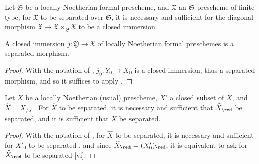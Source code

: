 \begin{corollary}[10.15.5]
\label{I.10.15.5}
Let $\mathfrak{S}$ be a locally Noetherian formal prescheme, and $\mathfrak{X}$ an $\mathfrak{S}$-prescheme of finite type;
for $\mathfrak{X}$ to be separated over $\mathfrak{S}$, it is necessary and sufficient for the diagonal morphism $\mathfrak{X}\to\mathfrak{X}\times_\mathfrak{S}\mathfrak{X}$ to be a closed immersion.
\end{corollary}

\begin{proposition}[10.15.6]
\label{I.10.15.6}
A closed immersion $j:\mathfrak{Y}\to\mathfrak{X}$ of locally Noetherian formal preschemes is a separated morphism.
\end{proposition}

\begin{proof}
With the notation of , $j_0:Y_0\to X_0$ is a closed immersion, thus a separated morphism, and so it suffices to apply .
\end{proof}

\begin{proposition}[10.15.7]
\label{I.10.15.7}
Let $X$ be a locally Noetherian (usual) prescheme, $X'$ a closed subset of $X$, and $\widehat{X}=X_{/X'}$.
For $\widehat{X}$ to be separated, it is necessary and sufficient that $\widehat{X}_\red$ be separated, and it is sufficient that $X$ be separated.
\end{proposition}

\begin{proof}
With the notation of , for $\widehat{X}$ to be separated, it is necessary and sufficient for $X'_0$ to be separated , and since $\widehat{X}_\red=(X'_0)_\red$, it is equivalent to ask for $\widehat{X}_\red$ to be separated [vi].
\end{proof}
